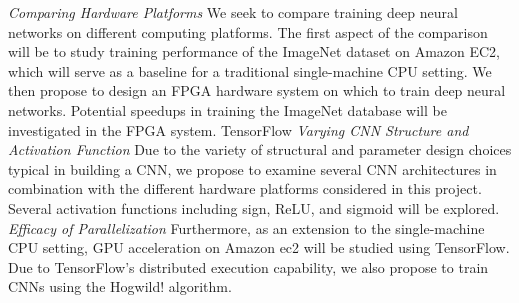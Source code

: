 \textit{Comparing Hardware Platforms}
		We seek to compare training deep neural networks on different computing platforms.  The first aspect of the comparison will be to study training performance of the ImageNet dataset on Amazon EC2, which will serve as a baseline for a traditional single-machine CPU setting.  We then propose to design an FPGA hardware system on which to train deep neural networks.  Potential speedups in training the ImageNet database will be investigated in the FPGA system.  
TensorFlow
	\textit{Varying CNN Structure and Activation Function}
Due to the variety of structural and parameter design choices typical in building a CNN, we propose to examine several CNN architectures in combination with the different hardware platforms considered in this project.  Several activation functions including sign, ReLU, and sigmoid will be explored. 
	\textit{Efficacy of Parallelization}
Furthermore, as an extension to the single-machine CPU setting, GPU acceleration on Amazon ec2 will be studied using TensorFlow.  Due to TensorFlow’s distributed execution capability, we also propose to train CNNs using the Hogwild! algorithm.   
